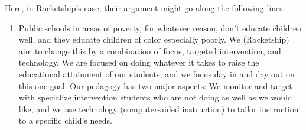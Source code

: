 Here, in Rocketship's case, their argument might go along the following lines:
\begin{enumerate}[topsep=0.3\baselineskip,itemsep=0.25\baselineskip]
  \item Public schools in areas of poverty, for whatever reason, don't educate children well, and they educate children of color especially poorly. We (Rocketship) aim to change this by a combination of focus, targeted intervention, and technology. We are focused on doing whatever it takes to raise the educational attainment of our students, and we focus day in and day out on this one goal. Our pedagogy has two major aspects: We monitor and target with specialize intervention students who are not doing as well as we would like, and we use technology (computer-aided instruction) to tailor instruction to a specific child's needs.
  

\end{enumerate}
